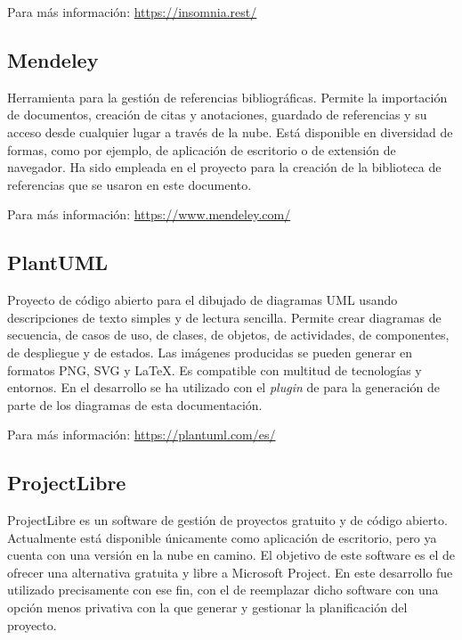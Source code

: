 Para más información: \href{https://insomnia.rest/}{https://insomnia.rest/}

\subsection{Mendeley}

Herramienta para la gestión de referencias bibliográficas. Permite la importación de documentos, creación de citas y anotaciones, guardado de referencias y su acceso desde cualquier lugar a través de la nube. Está disponible en diversidad de formas, como por ejemplo, de aplicación de escritorio o de extensión de navegador. Ha sido empleada en el proyecto para la creación de la biblioteca de referencias que se usaron en este documento.

Para más información: \href{https://www.mendeley.com/}{https://www.mendeley.com/}

\subsection{PlantUML}
\label{ssec:plant_uml}

Proyecto de código abierto para el dibujado de diagramas UML usando descripciones de texto simples y de lectura sencilla. Permite crear diagramas de secuencia, de casos de uso, de clases, de objetos, de actividades, de componentes, de despliegue y de estados. Las imágenes producidas se pueden generar en formatos PNG, SVG y LaTeX. Es compatible con multitud de tecnologías y entornos. En el desarrollo se ha utilizado con el \emph{plugin} de  para la generación de parte de los diagramas de esta documentación.

Para más información: \href{https://plantuml.com/es/}{https://plantuml.com/es/}

\subsection{ProjectLibre}

ProjectLibre es un software de gestión de proyectos gratuito y de código abierto. Actualmente está disponible únicamente como aplicación de escritorio, pero ya cuenta con una versión en la nube en camino. El objetivo de este software es el de ofrecer una alternativa gratuita y libre a Microsoft Project. En este desarrollo fue utilizado precisamente con ese fin, con el de reemplazar dicho software con una opción menos privativa con la que generar y gestionar la planificación del proyecto.

